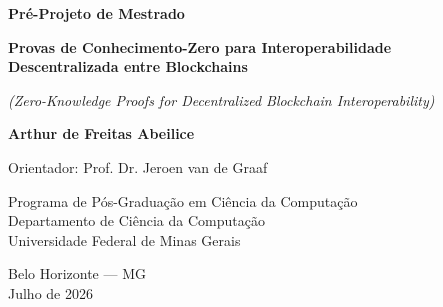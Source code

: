 \documentclass[12pt,a4paper]{article}
\begin{document}
\begin{titlepage}
  \centering
  \vspace*{3cm}

  {\LARGE \textbf{Pré-Projeto de Mestrado}\par}
  \vspace{1.5cm}

  {\Large \textbf{Provas de Conhecimento-Zero para Interoperabilidade}\\
           \textbf{Descentralizada entre Blockchains}\par}
  \vspace{0.5cm}
  \textit{(Zero-Knowledge Proofs for Decentralized Blockchain Interoperability)}

  \vspace{2cm}

  {\large \textbf{Arthur de Freitas Abeilice}\par}
  \vspace{0.5cm}
  {\large Orientador: Prof. Dr. Jeroen van de Graaf\par}

  \vspace{2cm}

  {\large Programa de Pós-Graduação em Ciência da Computação\\
           Departamento de Ciência da Computação\\
           Universidade Federal de Minas Gerais\par}

  \vspace{1cm}
  {\large Belo Horizonte — MG\\
           Julho de 2026\par}

  \vfill
\end{titlepage}

\begin{abstract}
\lipsum[1-2]

\noindent\textbf{Palavras-chave:} Provas de conhecimento-zero, interoperabilidade entre blockchains, provas de armazenamento, provas de consenso, sistemas distribuídos.
\end{abstract}

\newpage

\renewcommand{\abstractname}{Abstract}
\begin{abstract}
\lipsum[1-2]

\noindent\textbf{Keywords:} Zero-knowledge proofs, blockchain interoperability, storage proofs, consensus proofs, distributed systems.
\end{abstract}
\end{document}
